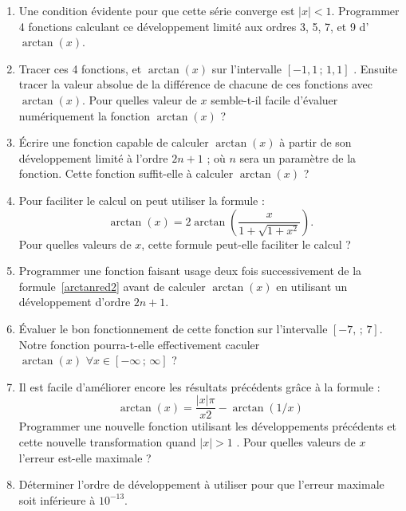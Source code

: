 \begin{enumerate}
\item Une condition évidente pour que cette série converge est $|x|<1$.
 Programmer 4 fonctions calculant ce développement limité aux ordres 3, 5, 7, et 9
d'$\arctan(x)$. 
\item Tracer ces 4 fonctions, et $\arctan(x)$ 
sur l'intervalle $[-1,1\,;\,1,1]$ .
Ensuite tracer la valeur absolue de la différence 
de chacune de ces fonctions avec $\arctan(x)$. 
Pour quelles valeur de $x$ semble-t-il facile 
d'évaluer numériquement la fonction $\arctan(x)$ ? 
\item Écrire une fonction capable de calculer $\arctan(x)$ à partir de 
son développement limité à l'ordre $2n+1$ ; où $n$ 
sera un paramètre de la fonction.
Cette fonction suffit-elle à calculer $\arctan(x)$ ? 
\item Pour faciliter le calcul on peut utiliser la formule : 
\begin{equation}\label{arctanred2}
\arctan(x) = 2 \arctan\left(\frac{x}{1+\sqrt{1+x^2}}\right).
\end{equation}
Pour quelles valeurs de $x$, cette formule peut-elle faciliter le calcul ? 
\item Programmer une fonction faisant usage 
deux fois successivement de la formule~\ref{arctanred2} 
avant de calculer $\arctan(x)$ en utilisant 
un développement d'ordre $2n+1$. 
\item Évaluer le bon fonctionnement de cette fonction sur 
l'intervalle $[-7,\,;\,7]$. Notre fonction pourra-t-elle effectivement 
caculer $\arctan(x) \,\, \forall x \in [-\infty\,;\,\infty]$ ?
\item Il est facile d'améliorer encore les résultats précédents 
grâce à la formule : 
\begin{equation}
\arctan(x) = \frac{|x|\pi}{x2}-\arctan(1/x) 
\end{equation}
Programmer une nouvelle fonction utilisant les développements précédents et
cette nouvelle transformation quand $|x|>1$ . Pour 
quelles valeurs de $x$ l'erreur est-elle maximale ? 
\item Déterminer l'ordre de développement à utiliser pour que 
l'erreur maximale soit inférieure à $10^{-13}$.
\end{enumerate}

